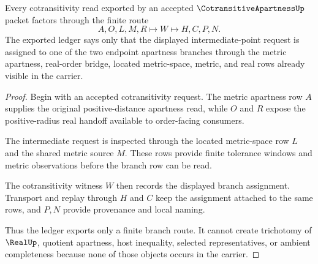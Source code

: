 \begin{theorem}
\label{thm:cotransitive-apartness-cotransitivity-ledger}
Every cotransitivity read exported by an accepted $\CotransitiveApartnessUp$ packet factors through the finite route
$$
A,O,L,M,R\longmapsto W\longmapsto H,C,P,N .
$$
The exported ledger says only that the displayed intermediate-point request is assigned to one of the two endpoint apartness branches through the metric apartness, real-order bridge, located metric-space, metric, and real rows already visible in the carrier.
\end{theorem}
\begin{proof}
Begin with an accepted cotransitivity request. The metric apartness row $A$ supplies the original positive-distance apartness read, while $O$ and $R$ expose the positive-radius real handoff available to order-facing consumers.

The intermediate request is inspected through the located metric-space row $L$ and the shared metric source $M$. These rows provide finite tolerance windows and metric observations before the branch row can be read.

The cotransitivity witness $W$ then records the displayed branch assignment. Transport and replay through $H$ and $C$ keep the assignment attached to the same rows, and $P,N$ provide provenance and local naming.

Thus the ledger exports only a finite branch route. It cannot create trichotomy of $\RealUp$, quotient apartness, host inequality, selected representatives, or ambient completeness because none of those objects occurs in the carrier.
\end{proof}

